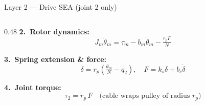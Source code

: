\documentclass[10pt,aspectratio=169]{beamer}
\newcommand{\ks}{k_s}
\newcommand{\bc}{b_c}
\begin{document}
\begin{frame}{Layer 2 --- Drive SEA (joint 2 only)}
\begin{columns}[T,onlytextwidth]
\begin{column}{0.48\textwidth}
\smallskip
\textbf{2.~Rotor dynamics:}
\begin{equation*}
    J_m\ddot\theta_m = \tau_m - b_m\dot\theta_m - \tfrac{r_p F}{N}
\end{equation*}

\textbf{3.~Spring extension \& force:}
\begin{equation*}
    \delta = r_p\!\left(\tfrac{\theta_m}{N} - q_2\right),\quad
    F = \ks\delta + \bc\dot\delta
\end{equation*}

\textbf{4.~Joint torque:}
\begin{equation*}
    \tau_2 = r_p\,F \quad\text{(cable wraps pulley of radius }r_p\text{)}
\end{equation*}
\end{column}
\end{columns}
\end{frame}
\end{document}
